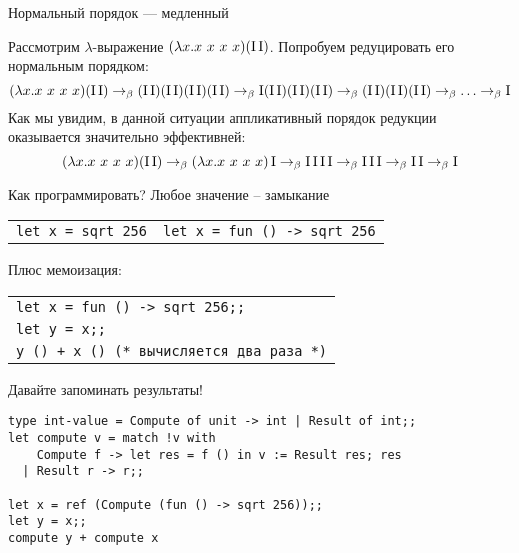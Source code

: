 \documentclass[aspectratio=169]{beamer}
\begin{document}
\begin{frame}{Нормальный порядок --- медленный}

\begin{exm}
	Рассмотрим $\lambda$-выражение $(\lambda{}x.x \ x \ x \ x) (\comb I \comb I)$. Попробуем редуцировать его нормальным порядком:
	 \[(\lambda{}x.x \ x \ x \ x) (\comb I \comb I) \to_{\beta} (\comb I \comb I)(\comb I \comb I)(\comb I \comb I)(\comb I \comb I) \to_{\beta} \comb I(\comb I \comb I)(\comb I \comb I)(\comb I \comb I) \to_{\beta} (\comb I \comb I)(\comb I \comb I)(\comb I \comb I) \to_{\beta} \ldots \to_{\beta} \comb I\] 
	Как мы увидим, в данной ситуации аппликативный порядок редукции оказывается значительно эффективней: 
	\[ (\lambda{}x.x \ x \ x \ x) (\comb I \comb I) \to_{\beta} (\lambda{}x.x \ x \ x \ x) \comb I \to_{\beta} \comb I \comb I \comb I \comb I\to_{\beta} \comb I \comb I \comb I \to_{\beta} \comb I \comb I \to_{\beta} \comb I \]
\end{exm}
\end{frame}

\begin{frame}[fragile]{Как программировать? Любое значение -- замыкание}

\begin{center}\begin{tabular}{ll}
\texttt{let x = sqrt 256} &     \texttt{let x = fun () -> sqrt 256}
\end{tabular}\end{center}

Плюс мемоизация: 

\begin{center}\begin{tabular}{l}
\texttt{let x = fun () -> sqrt 256;;}\\
\texttt{let y = x;;}\\
\texttt{y () + x ()      (* вычисляется два раза *)}
\end{tabular}\end{center}

Давайте запоминать результаты!
\begin{verbatim}
type int-value = Compute of unit -> int | Result of int;;
let compute v = match !v with
    Compute f -> let res = f () in v := Result res; res
  | Result r -> r;;

let x = ref (Compute (fun () -> sqrt 256));;
let y = x;;
compute y + compute x
\end{verbatim}
\end{frame}
\end{document}
